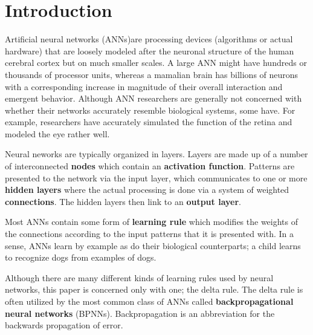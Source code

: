 \documentclass{acm_proc_article-sp}
\begin{document}







\section{Introduction}
Artificial neural networks (ANNs)are processing devices (algorithms or actual hardware) that are loosely modeled after the neuronal structure of the human cerebral cortex but on much smaller scales. A large ANN might have hundreds or thousands of processor units, whereas a mamalian brain has billions of neurons with a corresponding increase in magnitude of their overall interaction and emergent behavior. Although ANN researchers are generally not concerned with whether their networks accurately resemble biological systems, some have. For example, researchers have accurately simulated the function of the retina and modeled the eye rather well.

Neural neworks are typically organized in layers. Layers are made up of a number of interconnected \textbf{nodes} which contain an \textbf{activation function}. Patterns are presented to the network via the input layer, which communicates to one or more \textbf{hidden layers} where the actual processing is done via a system of weighted \textbf{connections}. The hidden layers then link to an \textbf{output layer}.

Most ANNs contain some form of \textbf{learning rule} which modifies the weights of the connections according to the input patterns that it is presented with. In a sense, ANNs learn by example as do their biological counterparts; a child learns to recognize dogs from examples of dogs.

Although there are many different kinds of learning rules used by neural networks, this paper is concerned only with one; the delta rule. The delta rule is often utilized by the most common class of ANNs called \textbf{backpropagational neural networks} (BPNNs). Backpropagation is an abbreviation for the backwards propagation of error.
\end{document}
